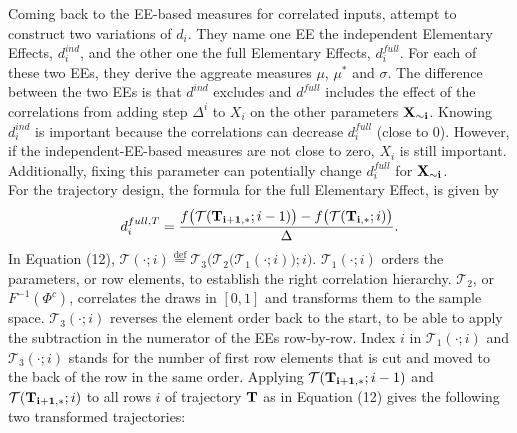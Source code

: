 \documentclass[a4paper,12pt]{article}
\newcommand*{\defeq}{\stackrel{\text{def}}{=}}
\begin{document}
Coming back to the EE-based measures for correlated inputs, \cite{ge2017extending} attempt to construct two variations of $d_i$. They name one EE the independent Elementary Effects, $d_i^{ind}$, and the other one the full Elementary Effects, $d_i^{full}$. For each of these two EEs, they derive the aggreate measures $\mu$, $\mu^*$ and $\sigma$. The difference between the two EEs is that $d^{ind}$ excludes and $d^{full}$ includes the effect of the correlations from adding step $\Delta^i$ to $X_i$ on the other parameters $\bold{X_{\sim i}}$. Knowing $d_i^{ind}$ is important because the correlations can decrease $d_i^{full}$ (close to 0). However, if the independent-EE-based measures are not close to zero, $X_i$ is still important. Additionally, fixing this parameter can potentially change $d_i^{full}$ for $\bold{X_{\sim i}}$.\\

\noindent 
For the trajectory design, the formula for the full Elementary Effect, is given by
\begin{align} \label{eq:d_full}
d_i^{full,T} = \frac{f\big(\mathcal{T}(\bold{T_{i+1,*}}; i-1)\big) - f\big(\mathcal{T}(\bold{T_{i,*}}; i)\big)}{\Delta}.
\end{align}
In Equation (12), $\mathcal{T}(\cdot; i) \defeq \mathcal{T}_3\bigg(\mathcal{T}_2\big(\mathcal{T}_1(\cdot; i)\big); i\bigg)$. $\mathcal{T}_1(\cdot; i)$ orders the parameters, or row elements, to establish the right correlation hierarchy. $\mathcal{T}_2$, or $F^{-1}(\Phi^c)$, correlates the draws in $[0,1]$ and transforms them to the sample space. $\mathcal{T}_3(\cdot; i)$ reverses the element order back to the start, to be able to apply the subtraction in the numerator of the EEs row-by-row. Index $i$ in $\mathcal{T}_1(\cdot; i)$ and $\mathcal{T}_3(\cdot; i)$ stands for the number of first row elements that is cut and moved to the back of the row in the same order. Applying $\mathcal{T}(\bold{T_{i+1,*}}; i-1)$ and $\mathcal{T}(\bold{T_{i+1,*}}; i)$ to all rows $i$ of trajectory $\bold{T}$ as in Equation (12) gives the following two transformed trajectories:
\end{document}
